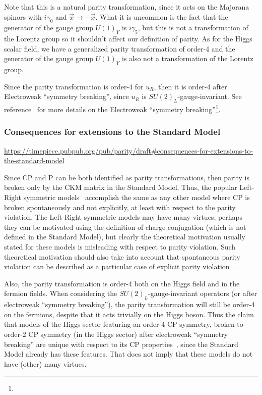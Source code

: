\documentclass[11pt]{book}
\begin{document}
Note that this is a natural parity transformation, since it acts on the
Majorana spinors with \(i\gamma_0\) and \(\vec{x}\to -\vec{x}\). What it
is uncommon is the fact that the generator of the gauge group \(U(1)_Y\)
is \(i\gamma_5\), but this is not a transformation of the Lorentz group
so it shouldn't affect our definition of parity. As for the Higgs scalar
field, we have a generalized parity transformation of order-4 and the
generator of the gauge group \(U(1)_Y\) is also not a transformation of
the Lorentz group.

Since the parity transformation is order-4 for \(u_R\), then it is
order-4 after Electroweak ``symmetry breaking'', since \(u_R\) is
\(SU(2)_L\)-gauge-invariant. See
reference~\cite{Maas2016Gauge}
for more details on the Electroweak ``symmetry breaking''\footnote{}.

\hypertarget{consequences-for-extensions-to-the-standard-model}{%
\subsubsection{Consequences for extensions to the Standard
Model}\label{consequences-for-extensions-to-the-standard-model}}

\url{https://timepiece.pubpub.org/pub/parity/draft\#consequences-for-extensions-to-the-standard-model}

Since CP and P can be both identified as parity transformations, then
parity is broken only by the CKM matrix in the Standard Model. Thus, the
popular Left-Right symmetric
models~\cite{Ecker1981Quark}\cite{Maiezza2017Higgs}
accomplish the same as any other model where CP is broken spontaneously
and not explicitly, at least with respect to the parity violation. The
Left-Right symmetric models may have many virtues, perhaps they can be
motivated using the definition of charge conjugation (which is not
defined in the Standard Model), but clearly the theoretical motivation
usually stated for these models is misleading with respect to parity
violation. Such theoretical motivation should also take into account
that spontaneous parity violation can be described as a particular case
of explicit parity violation~\cite{Maas2016Gauge}.

Also, the parity transformation is order-4 both on the Higgs field and
in the fermion fields. When considering the \(SU(2)_L\)-gauge-invariant
operators (or after electroweak ``symmetry breaking''), the parity
transformation will still be order-4 on the fermions, despite that it
acts trivially on the Higgs boson. Thus the claim that models of the
Higgs sector featuring an order-4 CP symmetry, broken to order-2 CP
symmetry (in the Higgs sector) after electroweak ``symmetry breaking''
are unique with respect to its CP
properties~\cite{Ferreira2017CP4}, since the Standard Model already has these features. That does
not imply that these models do not have (other) many virtues.
\end{document}
